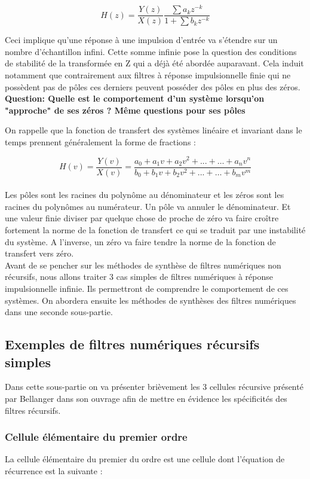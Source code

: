 \documentclass[11pt,a4paper]{article}
\begin{document}
\[  H(z) = \frac{Y(z)}{X(z)} \frac{\sum a_k z^{-k}}{1 + \sum b_k z^{-k}}  \]

Ceci implique qu'une réponse à une impulsion d'entrée va s'étendre sur un nombre d'échantillon infini. Cette somme infinie pose la question des conditions de stabilité de la transformée en Z qui a déjà été abordée auparavant. Cela induit notamment que contrairement aux filtres à réponse impulsionnelle finie qui ne possèdent pas de pôles ces derniers peuvent posséder des pôles en plus des zéros.\\

\textbf{Question: Quelle est le comportement d'un système lorsqu'on "approche" de ses zéros ? Même questions pour ses pôles}

On rappelle que la fonction de transfert des systèmes linéaire et invariant dans le temps prennent généralement la forme de fractions : 

\[ H(v) =  \frac{Y(v)}{X(v)} = \frac{a_0 + a_1 v + a_2 v^2 + ... + \ldots + a_n v^n}{ b_0 +b_1 v + b_2 v^2 + ... + \ldots + b_m v^m} \]\\

Les pôles sont les racines du polynôme au dénominateur et les zéros sont les racines du polynômes au numérateur. Un pôle va annuler le dénominateur. Et une valeur finie diviser par quelque chose de proche de zéro va faire croître fortement la norme de la fonction de transfert ce qui se traduit par une instabilité du système. A l'inverse, un zéro va faire tendre la norme de la fonction de transfert vers zéro.\\

Avant de se pencher sur les méthodes de synthèse de filtres numériques non récursifs, nous allons traiter 3 cas simples de filtres numériques à réponse impulsionnelle infinie. Ils permettront de comprendre le comportement de ces systèmes. On abordera ensuite les méthodes de synthèses des filtres numériques dans une seconde sous-partie.\\

\subsection{Exemples de filtres numériques récursifs simples}
Dans cette sous-partie on va présenter brièvement les 3 cellules récursive présenté par Bellanger dans son ouvrage afin de mettre en évidence les spécificités des filtres récursifs.\\
\subsubsection{Cellule élémentaire du premier ordre}
La cellule élémentaire du premier du ordre est une cellule dont l'équation de récurrence est la suivante :\\
\end{document}
